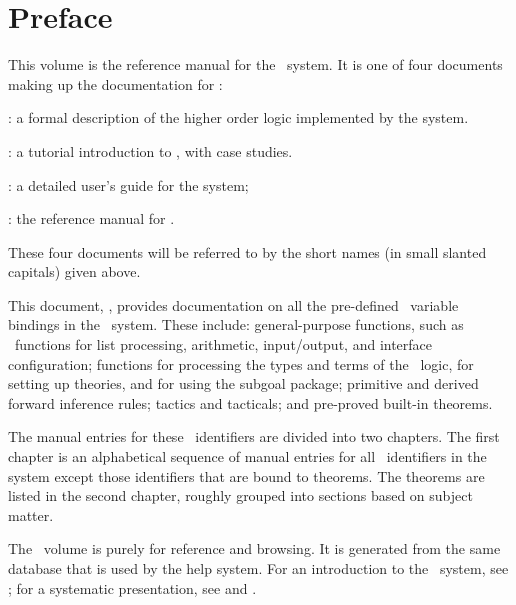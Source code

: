 \chapter*{Preface}

This volume is the reference manual for the \HOL\ system.
It is one of four documents making up the documentation for \HOL:

\begin{myenumerate}
\item \LOGIC: a formal description of the higher order logic
  implemented by the \HOL{} system.
\item \TUTORIAL: a tutorial introduction to \HOL, with case studies.
\item \DESCRIPTION: a detailed user's guide for the \HOL{} system;
\item \REFERENCE: the reference manual for \HOL.
\end{myenumerate}

\noindent These four documents will be referred to by the short names (in
small slanted capitals) given above.

This document, \REFERENCE, provides documentation on all the pre-defined \ML\
variable bindings in the \HOL\ system.  These include: general-purpose
functions, such as \ML\ functions for list processing, arithmetic,
input/output, and interface configuration; functions for processing the types
and terms of the \HOL\ logic, for setting up theories, and for using the
subgoal package; primitive and derived forward inference rules; tactics and
tacticals; and pre-proved built-in theorems.

The manual entries for these \ML\ identifiers are divided into two chapters.
The first chapter is an alphabetical sequence of manual entries for all \ML\
identifiers in the system except those identifiers that are bound to theorems.
The theorems are listed in the second chapter, roughly grouped into sections
based on subject matter.

The \REFERENCE\ volume is purely for reference and browsing. It is generated
from the same database that is used by the help system. For an introduction to
the \HOL\ system, see \TUTORIAL; for a systematic presentation, see
\DESCRIPTION{}  and \LOGIC{}.





